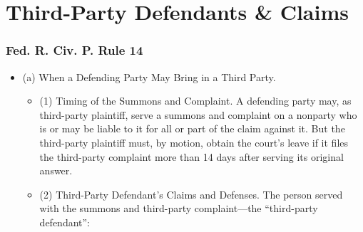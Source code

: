\documentclass[11pt,letterpaper,twoside]{article}
\providecommand{\tightlist}{%
\setlength{\itemsep}{0em}\setlength{\parskip}{0em}\setlength{\itemindent}{0em}}
\begin{document}
\section{Third-Party Defendants \&
Claims}\label{third-party-defendants-claims}

\subsubsection{Fed. R. Civ. P. Rule 14}\label{fedciv_rule14}

\begin{itemize}
\tightlist
\item
  (a) When a Defending Party May Bring in a Third Party.

  \begin{itemize}
  \tightlist
  \item
    (1) Timing of the Summons and Complaint. A defending party may, as
    third-party plaintiff, serve a summons and complaint on a nonparty
    who is or may be liable to it for all or part of the claim against
    it. But the third-party plaintiff must, by motion, obtain the
    court's leave if it files the third-party complaint more than 14
    days after serving its original answer.
  \item
    (2) Third-Party Defendant's Claims and Defenses. The person served
    with the summons and third-party complaint---the ``third-party
    defendant'':


\end{itemize}
\end{itemize}
\end{document}

